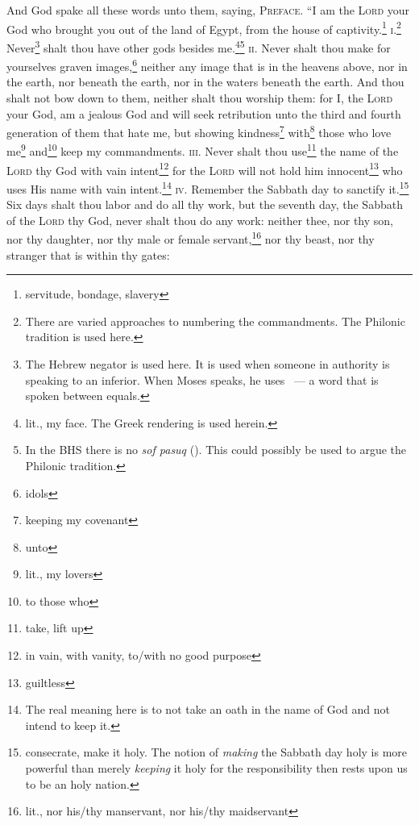
\begin{inparaenum}
     And God spake all these words unto them, saying,%
     \textsc{Preface.} ``I am the \textsc{Lord} your God who brought you out of the land of Egypt, from the house of captivity.\footnote{servitude, bondage, slavery}%
     \textsc{i.}\footnote{There are varied approaches to numbering the commandments. The Philonic tradition is used here.} Never\footnote{The Hebrew negator  is used here. It is used when someone in authority is speaking to an inferior. When Moses speaks, he uses ~--- a word that is spoken between equals.} shalt thou have other gods besides me.\footnote{lit., my face. The Greek rendering is used herein.}\footnote{In the BHS there is no \textit{sof pasuq} (). This could possibly be used to argue the Philonic tradition.}%
     \textsc{ii.} Never shalt thou make for yourselves graven images,\footnote{idols} neither any image that is in the heavens above, nor in the earth, nor beneath the earth, nor in the waters beneath the earth.%
     And thou shalt not bow down to them, neither shalt thou worship them: for I, the \textsc{Lord} your God, am a jealous God and will seek retribution unto the third and fourth generation of them that hate me,%
     but showing kindness\footnote{keeping my covenant} with\footnote{unto} those who love me\footnote{lit., my lovers} and\footnote{to those who} keep my commandments.%
     \textsc{iii.} Never shalt thou use\footnote{take, lift up} the name of the \textsc{Lord} thy God with vain intent\footnote{in vain, with vanity, to/with no good purpose} for the \textsc{Lord} will not hold him innocent\footnote{guiltless} who uses His name with vain intent.\footnote{The real meaning here is to not take an oath in the name of God and not intend to keep it.}%
     \textsc{iv.} Remember the Sabbath day to sanctify it.\footnote{consecrate, make it holy. The notion of \emph{making} the Sabbath day holy is more powerful than merely \emph{keeping} it holy for the responsibility then rests upon us to be an holy nation.}%
     Six days shalt thou labor and do all thy work,%
     but the seventh day, the Sabbath of the \textsc{Lord} thy God, never shalt thou do any work: neither thee, nor thy son, nor thy daughter, nor thy male or female servant,\footnote{lit., nor his/thy manservant, nor his/thy maidservant} nor thy beast, nor thy stranger that is within thy gates:%

\end{inparaenum}
